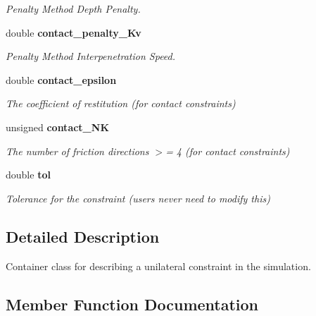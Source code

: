 \begin{DoxyCompactItemize}
\begin{DoxyCompactList}\small\item\em Penalty Method Depth Penalty. \end{DoxyCompactList}\item 
double {\bf contact\-\_\-penalty\-\_\-\-Kv}\label{classMoby_1_1UnilateralConstraint_ab5baefb385e742bd2b42ee31bad7f602}

\begin{DoxyCompactList}\small\item\em Penalty Method Interpenetration Speed. \end{DoxyCompactList}\item 
double {\bf contact\-\_\-epsilon}\label{classMoby_1_1UnilateralConstraint_a47276aaf51eddf9f6c4669150ee3ca14}

\begin{DoxyCompactList}\small\item\em The coefficient of restitution (for contact constraints) \end{DoxyCompactList}\item 
unsigned {\bf contact\-\_\-\-N\-K}\label{classMoby_1_1UnilateralConstraint_a543d1c0d71372b9b1a03f382898a872d}

\begin{DoxyCompactList}\small\item\em The number of friction directions $>$= 4 (for contact constraints) \end{DoxyCompactList}\item 
double {\bf tol}\label{classMoby_1_1UnilateralConstraint_aeb31d40932b7a6ab962e3f2cbf18135f}

\begin{DoxyCompactList}\small\item\em Tolerance for the constraint (users never need to modify this) \end{DoxyCompactList}\end{DoxyCompactItemize}


\subsection{Detailed Description}
Container class for describing a unilateral constraint in the simulation. 

\subsection{Member Function Documentation}
